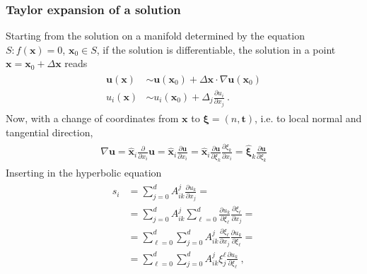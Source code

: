 \documentclass[letterpaper,10pt,english]{jupyterBook}
\begin{document}
\subsubsection{Taylor expansion of a solution}
\label{\detokenize{ch/pde/characteristics:taylor-expansion-of-a-solution}}
\sphinxAtStartPar
Starting from the solution on a manifold determined by the equation \(S: f(\mathbf{x}) = 0\), \(\mathbf{x}_0 \in S\), if the solution is differentiable, the solution in a point \(\mathbf{x} = \mathbf{x}_0 + \Delta \mathbf{x}\) reads
\begin{equation*}
\begin{split}\begin{aligned}
  \mathbf{u}(\mathbf{x}) & \sim \mathbf{u}(\mathbf{x}_0) + \Delta \mathbf{x} \cdot \nabla \mathbf{u}(\mathbf{x}_0) \\
  u_i(\mathbf{x}) & \sim u_i(\mathbf{x}_0) + \Delta_j \frac{\partial u_i}{\partial x_j} \ .
\end{aligned}\end{split}
\end{equation*}
\sphinxAtStartPar
Now, with a change of coordinates from \(\mathbf{x}\) to \(\boldsymbol\xi = (n, \mathbf{t})\), i.e. to local normal and tangential direction,
\begin{equation*}
\begin{split}\begin{aligned}
  \nabla \mathbf{u} 
  = \hat{\mathbf{x}}_i \frac{\partial}{\partial x_i} \mathbf{u} 
  = \hat{\mathbf{x}}_i \frac{\partial \mathbf{u}}{\partial x_i} 
  = \hat{\mathbf{x}}_i \frac{\partial \mathbf{u}}{\partial \xi_k} \frac{\partial \xi_k}{\partial x_i} 
  = \hat{\boldsymbol\xi}_k \frac{\partial \mathbf{u}}{\partial \xi_k}
\end{aligned}\end{split}
\end{equation*}
\sphinxAtStartPar
Inserting in the hyperbolic equation
\begin{equation*}
\begin{split}\begin{aligned}
  s_i
  & = \sum_{j=0}^{d} A^{j}_{ik} \frac{\partial u_k}{\partial x_j} = \\
  & = \sum_{j=0}^{d} A^{j}_{ik} \sum_{\ell=0}^{d} \frac{\partial u_k}{\partial \xi_\ell} \frac{\partial \xi_\ell}{\partial x_j} = \\ 
  & = \sum_{\ell=0}^{d}  \sum_{j=0}^{d}  A^{j}_{ik} \frac{\partial \xi_\ell}{\partial x_j} \frac{\partial u_k}{\partial \xi_\ell} = \\ 
  & = \sum_{\ell=0}^{d}  \sum_{j=0}^{d}  A^{j}_{ik} \xi^\ell_j \frac{\partial u_k}{\partial \xi_\ell} \ ,
\end{aligned}\end{split}
\end{equation*}
\end{document}
